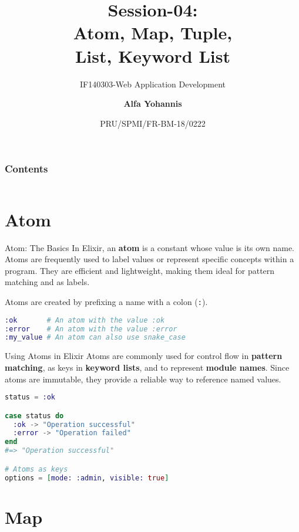 \documentclass[aspectratio=169, table]{beamer}
\subtitle{IF140303-Web Application Development}
\title{Session-04:\\
\Huge{
Atom, Map, Tuple,\\
\vspace{5pt}
List, Keyword List
\vspace{-18pt}
}
}
\date[Serial]{\scriptsize{PRU/SPMI/FR-BM-18/0222}}
\author[Pradita]{\small{\textbf{Alfa Yohannis}}}
\begin{document}
	
	\frame{\titlepage}
	
		\begin{frame}[fragile]
		\frametitle{Contents}
		\vspace{20pt}
		\begin{columns}[t]
			\tableofcontents[sections={1-4}]
			
			\tableofcontents[sections={5-8}]
		\end{columns}
	\end{frame}

\section{Atom}

\begin{frame}[fragile]{Atom: The Basics}
\vspace{20pt}
In Elixir, an \textbf{atom} is a constant whose value is its own name. Atoms are frequently used to label values or represent specific concepts within a program. They are efficient and lightweight, making them ideal for pattern matching and as labels.

Atoms are created by prefixing a name with a colon (\texttt{:}).

\begin{lstlisting}[language=Elixir]
:ok       # An atom with the value :ok
:error    # An atom with the value :error
:my_value # An atom can also use snake_case
\end{lstlisting}
\end{frame}


\begin{frame}[fragile]{Using Atoms in Elixir}
\vspace{20pt}
Atoms are commonly used for control flow in \textbf{pattern matching}, as keys in \textbf{keyword lists}, and to represent \textbf{module names}. Since atoms are immutable, they provide a reliable way to reference named values.

\begin{lstlisting}[language=Elixir]
status = :ok

case status do
  :ok -> "Operation successful"
  :error -> "Operation failed"
end
#=> "Operation successful"

# Atoms as keys
options = [mode: :admin, visible: true]
\end{lstlisting}
\end{frame}

\section{Map}
\end{document}
